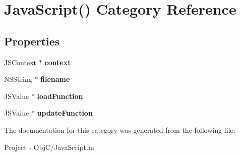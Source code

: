 \hypertarget{category_java_script_07_08}{}\section{Java\+Script() Category Reference}
\label{category_java_script_07_08}
\subsection*{Properties}
\begin{DoxyCompactItemize}
\item 
\hypertarget{category_java_script_07_08_a9df8383b2af2276cb2848ceb9ab47848}{}J\+S\+Context $\ast$ {\bfseries context}\label{category_java_script_07_08_a9df8383b2af2276cb2848ceb9ab47848}

\item 
\hypertarget{category_java_script_07_08_aeaabcd31ef65acfeb03d2190fdaa37cc}{}N\+S\+String $\ast$ {\bfseries filename}\label{category_java_script_07_08_aeaabcd31ef65acfeb03d2190fdaa37cc}

\item 
\hypertarget{category_java_script_07_08_aae25575363b92fe00696a83e0c38e838}{}J\+S\+Value $\ast$ {\bfseries load\+Function}\label{category_java_script_07_08_aae25575363b92fe00696a83e0c38e838}

\item 
\hypertarget{category_java_script_07_08_a6fc92dee8f351a80d8a0e4c890a30d83}{}J\+S\+Value $\ast$ {\bfseries update\+Function}\label{category_java_script_07_08_a6fc92dee8f351a80d8a0e4c890a30d83}

\end{DoxyCompactItemize}


The documentation for this category was generated from the following file\+:\begin{DoxyCompactItemize}
\item 
Project -\/ Obj\+C/Java\+Script.\+m\end{DoxyCompactItemize}
